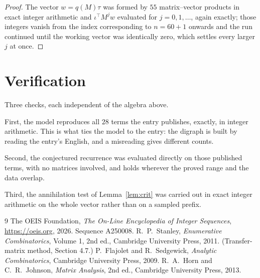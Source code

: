 \documentclass[11pt,a4paper]{article}
\theoremstyle{plain}
\theoremstyle{definition}
\begin{document}
\begin{proof}
The vector $w=q(M)\tau$ was formed by $55$ matrix--vector products in exact integer
arithmetic and $\iota^{\!\top}M^{j}w$ evaluated for $j=0,1,\dots$, again exactly; those
integers vanish from the index corresponding to $n=60+1$ onwards and the run continued
until the working vector was identically zero, which settles every larger $j$ at once.
\end{proof}

\section{Verification}

Three checks, each independent of the algebra above.

First, the model reproduces all $28$ terms the entry publishes, exactly, in integer
arithmetic. This is what ties the model to the entry: the digraph is built by reading the
entry's English, and a misreading gives different counts.

Second, the conjectured recurrence was evaluated directly on those published terms, with no
matrices involved, and holds wherever the proved range and the data overlap.

Third, the annihilation test of Lemma~\ref{lem:crit} was carried out in exact integer
arithmetic on the whole vector rather than on a sampled prefix.

\begin{thebibliography}{9}
 The OEIS Foundation, \emph{The On-Line Encyclopedia of Integer
Sequences}, \url{https://oeis.org}, 2026. Sequence A250008.
 R.~P.~Stanley, \emph{Enumerative Combinatorics}, Volume 1, 2nd ed.,
Cambridge University Press, 2011. (Transfer-matrix method, Section 4.7.)
 P.~Flajolet and R.~Sedgewick, \emph{Analytic Combinatorics}, Cambridge
University Press, 2009.
 R.~A.~Horn and C.~R.~Johnson, \emph{Matrix Analysis}, 2nd ed., Cambridge
University Press, 2013.
\end{thebibliography}
\end{document}

